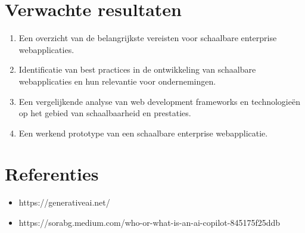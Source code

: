 \documentclass{hogent-article}
\begin{document}
    \section{Verwachte resultaten}
    \begin{enumerate}
        \item Een overzicht van de belangrijkste vereisten voor schaalbare enterprise webapplicaties.
        \item Identificatie van best practices in de ontwikkeling van schaalbare webapplicaties en hun relevantie voor ondernemingen.
        \item Een vergelijkende analyse van web development frameworks en technologieën op het gebied van schaalbaarheid en prestaties.
        \item Een werkend prototype van een schaalbare enterprise webapplicatie.
    \end{enumerate}
    
    
    \section{Referenties}
    
    \begin{itemize}
        \item   https://generativeai.net/
        \item  https://sorabg.medium.com/who-or-what-is-an-ai-copilot-845175f25ddb
    \end{itemize}
  
    
    
    \tableofcontents
    
    
\end{document}
